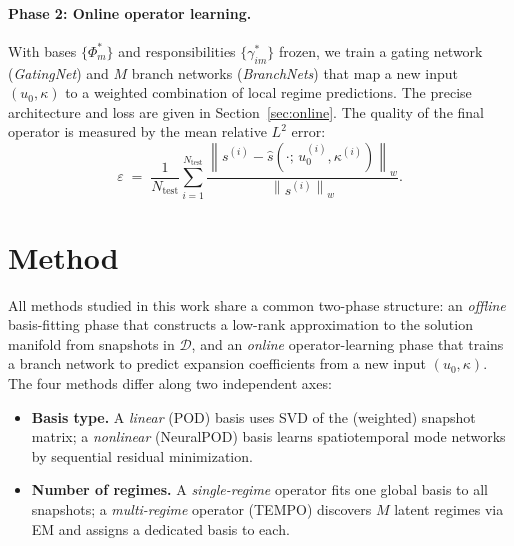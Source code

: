 \documentclass{article}
\newcommand{\norm}[1]{\left\|#1\right\|_w}
\begin{document}
\paragraph{Phase 2: Online operator learning.}

With bases $\{\Phi_m^*\}$ and responsibilities $\{\gamma_{im}^*\}$ frozen,
we train a gating network (\emph{GatingNet}) and $M$ branch networks (\emph{BranchNets}) that map a new input
$(u_0, \kappa)$ to a weighted combination of local regime predictions.
The precise architecture and loss are given in Section~\ref{sec:online}.
The quality of the final operator is measured by the mean relative $L^2$ error:
\begin{equation}
  \varepsilon \;=\; \frac{1}{N_\mathrm{test}}
  \sum_{i=1}^{N_\mathrm{test}}
  \frac{\norm{s^{(i)} - \hat{s}(\cdot;\,u_0^{(i)},\kappa^{(i)})}}
       {\norm{s^{(i)}}} .
  \label{eq:metric}
\end{equation}















\section{Method}\label{sec:theory}



All methods studied in this work share a common two-phase structure:
an \emph{offline} basis-fitting phase that constructs a low-rank
approximation to the solution manifold from snapshots in $\mathcal{D}$,
and an \emph{online} operator-learning phase that trains a branch
network to predict expansion coefficients from a new input
$(u_0, \kappa)$.
The four methods differ along two independent axes:

\begin{itemize}
  \item \textbf{Basis type.}
    A \emph{linear} (POD) basis uses SVD of the (weighted) snapshot
    matrix; a \emph{nonlinear} (NeuralPOD) basis learns spatiotemporal
    mode networks by sequential residual minimization.
  \item \textbf{Number of regimes.}
    A \emph{single-regime} operator fits one global basis to all
    snapshots; a \emph{multi-regime} operator (TEMPO) discovers $M$
    latent regimes via EM and assigns a dedicated basis to each.
\end{itemize}
\end{document}
